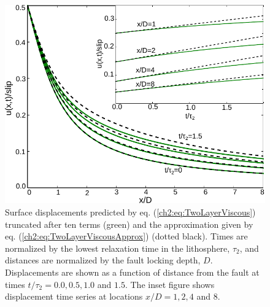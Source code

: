 \begin{figure}
\includegraphics{ch2/figures/Fig1.pdf}
\caption{Surface displacements predicted by eq.
(\ref{ch2:eq:TwoLayerViscous}) truncated after ten terms (green) and the
approximation given by eq. (\ref{ch2:eq:TwoLayerViscousApprox}) (dotted
black).  Times are normalized by the lowest relaxation time in the
lithosphere, $\tau_2$, and distances are normalized by the fault
locking depth, $D$.  Displacements are shown as a function of distance
from the fault at times $t/\tau_2 = 0.0,0.5,1.0$ and $1.5$. The inset
figure shows displacement time series at locations $x/D = 1, 2, 4$ and
$8$.}
\label{ch2:fig:1}
\end{figure} 


